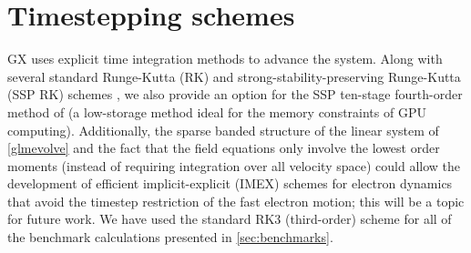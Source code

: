 \documentclass{jpp}
\newcommand{\GX}{{GX}\xspace}
\begin{document}
\section{Timestepping schemes} \label{sec:time}
\GX uses explicit time integration methods to advance the system.
Along with several standard Runge-Kutta (RK) and strong-stability-preserving Runge-Kutta (SSP RK) schemes \citep{Gottlieb2001}, we also provide an option for the SSP ten-stage fourth-order method of \citet{Ketcheson2008} (a low-storage method ideal for the memory constraints of GPU computing). 
Additionally, the sparse banded structure of the linear system of \cref{glmevolve} and the fact that the field equations only involve the lowest order moments (instead of requiring integration over all velocity space) could allow the development of efficient implicit-explicit (IMEX) schemes for electron dynamics that avoid the timestep restriction of the fast electron motion; this will be a topic for future work. {\color{black} We have used the standard RK3 (third-order) scheme for all of the benchmark calculations presented in \cref{sec:benchmarks}}. 
\end{document}
